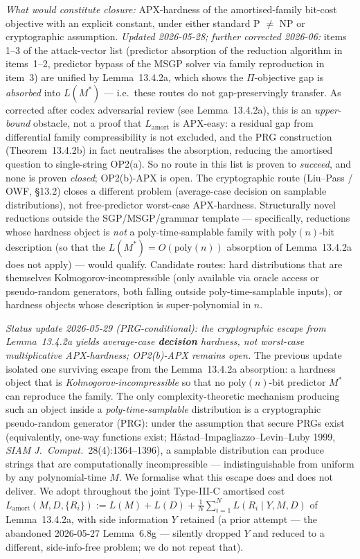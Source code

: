 \documentclass[
]{article}
\begin{document}
\emph{What would constitute closure:} APX-hardness of the
amortised-family bit-cost objective with an explicit constant,
under either standard P $\neq$ NP or cryptographic assumption.
\emph{Updated 2026-05-28; further corrected 2026-06:} items 1--3
of the attack-vector list (predictor absorption of the reduction
algorithm in items~1--2, predictor bypass of the MSGP solver via
family reproduction in item~3) are unified by Lemma~13.4.2a, which
shows the $\Pi$-objective gap is \emph{absorbed} into $L(M^*)$ ---
i.e.\ these routes do not gap-preservingly transfer. As corrected
after codex adversarial review (see Lemma~13.4.2a), this is an
\emph{upper-bound} obstacle, not a proof that $L_{\mathrm{amort}}$
is APX-easy: a residual gap from differential family
compressibility is not excluded, and the PRG construction
(Theorem~13.4.2b) in fact neutralises the absorption, reducing the
amortised question to single-string OP2(a). So no route in this
list is proven to \emph{succeed}, and none is proven \emph{closed};
OP2(b)-APX is open.
The cryptographic route (Liu--Pass / OWF, §13.2) closes a
different problem (average-case decision on samplable distributions),
not free-predictor worst-case APX-hardness. Structurally novel
reductions outside the SGP/MSGP/grammar template --- specifically,
reductions whose hardness object is \emph{not} a poly-time-samplable
family with $\mathrm{poly}(n)$-bit description (so that the
$L(M^*) = O(\mathrm{poly}(n))$ absorption of Lemma~13.4.2a does
not apply) --- would qualify. Candidate routes: hard distributions
that are themselves Kolmogorov-incompressible (only available via
oracle access or pseudo-random generators, both falling outside
poly-time-samplable inputs), or hardness objects whose description
is super-polynomial in $n$.

\emph{Status update 2026-05-29 (PRG-conditional): the cryptographic
escape from Lemma~13.4.2a yields average-case \textbf{decision}
hardness, not worst-case multiplicative APX-hardness; OP2(b)-APX
remains open.} The previous update isolated one surviving escape from
the Lemma~13.4.2a absorption: a hardness object that is
\emph{Kolmogorov-incompressible} so that no $\mathrm{poly}(n)$-bit
predictor $M^*$ can reproduce the family. The only complexity-theoretic
mechanism producing such an object inside a \emph{poly-time-samplable}
distribution is a cryptographic pseudo-random generator (PRG): under
the assumption that secure PRGs exist (equivalently, one-way functions
exist; H{\aa}stad--Impagliazzo--Levin--Luby 1999, \emph{SIAM J.\ Comput.}\
28(4):1364--1396), a samplable distribution can produce strings that
are computationally incompressible --- indistinguishable from uniform
by any polynomial-time $M$. We formalise what this escape does and does
not deliver. We adopt throughout the joint Type-III-C amortised cost
$L_{\mathrm{amort}}(M,D,\{R_i\}) := L(M)+L(D)+\frac1N\sum_{i=1}^N
L(R_i \mid Y, M, D)$ of Lemma~13.4.2a, with side information $Y$
retained (a prior attempt --- the abandoned 2026-05-27 Lemma~6.8g ---
silently dropped $Y$ and reduced to a different, side-info-free
problem; we do not repeat that).
\end{document}
